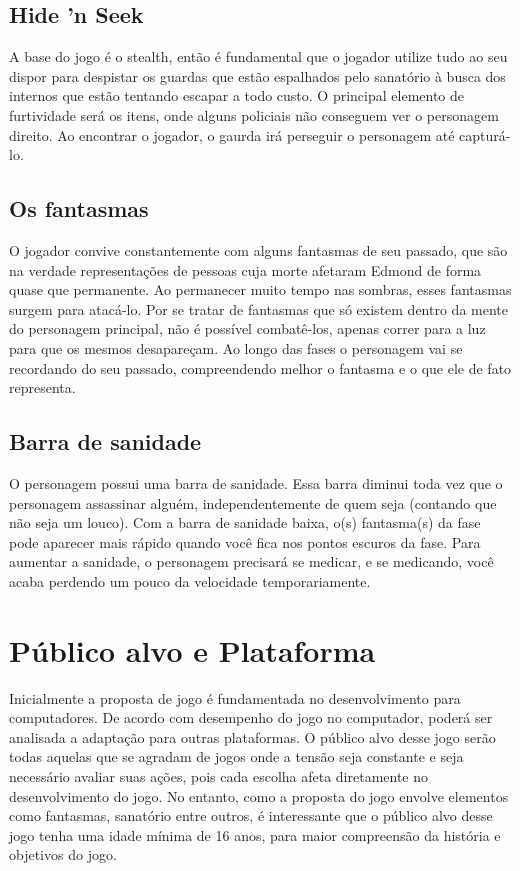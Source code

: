 \documentclass[12pt]{article}
\begin{document}
\subsection{Hide 'n Seek}
A base do jogo é o stealth, então é fundamental que o jogador utilize tudo ao seu dispor para despistar os guardas que estão espalhados pelo sanatório à busca dos internos que estão tentando escapar a todo custo. O principal elemento de furtividade será os itens, onde alguns policiais não conseguem ver o personagem direito. Ao encontrar o jogador, o gaurda irá perseguir o personagem até capturá-lo. 


\subsection{Os fantasmas}
O jogador convive constantemente com alguns fantasmas de seu passado, que são na verdade representações de pessoas cuja morte afetaram Edmond de forma quase que permanente. Ao permanecer muito tempo nas sombras, esses fantasmas surgem para atacá-lo. Por se tratar de fantasmas que só existem dentro da mente do personagem principal, não é possível combatê-los, apenas correr para a luz para que os mesmos desapareçam. Ao longo das fases o personagem vai se recordando do seu passado, compreendendo melhor o fantasma e o que ele de fato representa.

\subsection{Barra de sanidade}
O personagem possui uma barra de sanidade. Essa barra diminui toda vez que o personagem assassinar alguém, independentemente de quem seja (contando que não seja um louco). Com a barra de sanidade baixa, o(s) fantasma(s) da fase pode aparecer mais rápido quando você fica nos pontos escuros da fase. Para aumentar a sanidade, o personagem precisará se medicar, e se medicando, você acaba perdendo um pouco da velocidade temporariamente. 

\section{Público alvo e Plataforma}
Inicialmente a proposta de jogo é fundamentada no desenvolvimento para computadores. De acordo com desempenho do jogo no computador, poderá ser analisada a adaptação para outras plataformas.
O público alvo desse jogo serão todas aquelas que se agradam de jogos onde a tensão seja constante e seja necessário avaliar suas ações, pois cada escolha afeta diretamente no desenvolvimento do jogo. No entanto, como a proposta do jogo envolve elementos como fantasmas, sanatório entre outros, é interessante que o público alvo desse jogo tenha uma idade mínima de 16 anos, para maior compreensão da história e objetivos do jogo.
\end{document}
